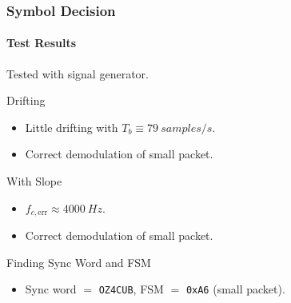 
\begin{frame} \frametitle{Symbol Decision}
    \framesubtitle{Test Results}
    Tested with signal generator.
    \begin{block}{Drifting}
        \begin{itemize}
        \item Little drifting with $T_b\equiv \SI{79}{samples\per s}$.
        \item Correct demodulation of small packet.
        \end{itemize}
    \end{block}
    \begin{block}{With Slope}
        \begin{itemize}
        \item $f_{c,\text{err}} \approx \SI{4000}{Hz}$.
        \item Correct demodulation of small packet.
        \end{itemize}
    \end{block}
    \begin{block}{Finding Sync Word and FSM}
        \begin{itemize}
        \item Sync word $=$ \texttt{OZ4CUB}, FSM $=$ \texttt{0xA6} (small packet).
        \end{itemize}
    \end{block}
\end{frame}

